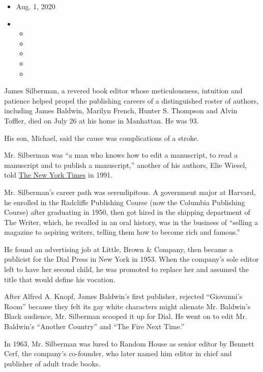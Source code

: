 \begin{itemize}
\item
  Aug. 1, 2020
\item
  \begin{itemize}
  \item
  \item
  \item
  \item
  \item
  \end{itemize}
\end{itemize}

James Silberman, a revered book editor whose meticulousness, intuition
and patience helped propel the publishing careers of a distinguished
roster of authors, including James Baldwin, Marilyn French, Hunter S.
Thompson and Alvin Toffler, died on July 26 at his home in Manhattan. He
was 93.

His son, Michael, said the cause was complications of a stroke.

Mr. Silberman was ``a man who knows how to edit a manuscript, to read a
manuscript and to publish a manuscript,'' another of his authors, Elie
Wiesel, told
\href{https://www.nytimes.com/1991/10/30/business/the-media-business-head-of-summit-books-is-said-to-be-leaving.html}{The
New York Times} in 1991.

Mr. Silberman's career path was serendipitous. A government major at
Harvard, he enrolled in the Radcliffe Publishing Course (now the
Columbia Publishing Course) after graduating in 1950, then got hired in
the shipping department of The Writer, which, he recalled in an oral
history, was in the business of ``selling a magazine to aspiring
writers, telling them how to become rich and famous.''

He found an advertising job at Little, Brown \& Company, then became a
publicist for the Dial Press in New York in 1953. When the company's
sole editor left to have her second child, he was promoted to replace
her and assumed the title that would define his vocation.

After Alfred A. Knopf, James Baldwin's first publisher, rejected
``Giovanni's Room'' because they felt its gay white characters might
alienate Mr. Baldwin's Black audience, Mr. Silberman scooped it up for
Dial. He went on to edit Mr. Baldwin's ``Another Country'' and ``The
Fire Next Time.''

In 1963, Mr. Silberman was lured to Random House as senior editor by
Bennett Cerf, the company's co-founder, who later named him editor in
chief and publisher of adult trade books.

